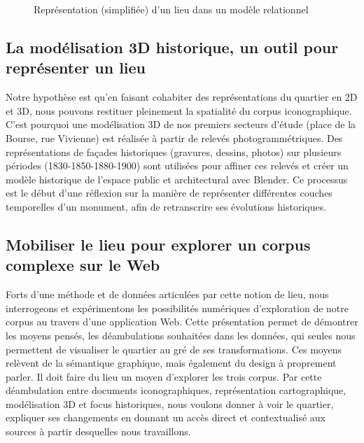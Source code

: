 \documentclass[11pt,french]{article}
\begin{document}
\begin{figure}
	\centering
	\caption{Représentation (simplifiée) d'un lieu dans un modèle relationnel}
	\label{fig:model}
\end{figure}

\subsection{La modélisation 3D historique, un outil pour représenter un lieu}
Notre hypothèse est qu’en faisant cohabiter des représentations du quartier en 2D et 3D, nous pouvons restituer pleinement la spatialité du corpus iconographique. C’est pourquoi une modélisation 3D de nos premiers secteurs d’étude (place de la Bourse, rue Vivienne) est réalisée à partir de relevés photogrammétriques. Des représentations de façades historiques (gravures, dessins, photos) sur plusieurs périodes (1830-1850-1880-1900) sont utilisées pour affiner ces relevés et créer un modèle historique de l’espace public et architectural avec Blender. Ce processus est le début d’une réflexion sur la manière de représenter différentes couches temporelles d’un monument, afin de retranscrire ses évolutions historiques.

\subsection{Mobiliser le lieu pour explorer un corpus complexe sur le Web}
Forts d’une méthode et de données articulées par cette notion de lieu, nous interrogeons et expérimentons les possibilités numériques d’exploration de notre corpus au travers d’une application Web. Cette présentation permet de démontrer les moyens pensés, les déambulations souhaitées dans les données, qui seules nous permettent de visualiser le quartier au gré de ses transformations. Ces moyens relèvent de la sémantique graphique, mais également du design à proprement parler. Il doit faire du lieu un moyen d’explorer les trois corpus. Par cette déambulation entre documents iconographiques, représentation cartographique, modélisation 3D et focus historiques, nous voulons donner à voir le quartier, expliquer ses changements en donnant un accès direct et contextualisé aux sources à partir desquelles nous travaillons. 
\end{document}
